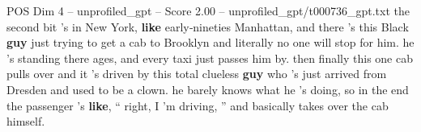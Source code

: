 \begin{textsample}{POS Dim 4 – unprofiled\_gpt – Score 2.00 – unprofiled\_gpt/t000736\_gpt.txt}  \label{ex:f4_pos_030}
the second bit 's in New York, \textbf{like} early‑nineties Manhattan, and there ’s this Black \textbf{guy} just trying to get a cab to Brooklyn and literally no one will stop for him. he ’s standing there ages, and every taxi just passes him by. then finally this one cab pulls over and it ’s driven by this total clueless \textbf{guy} who ’s just arrived from Dresden and used to be a clown. he barely knows what he ’s doing, so in the end the passenger ’s \textbf{like}, “ right, I ’m driving, ” and basically takes over the cab himself.

\end{textsample}
